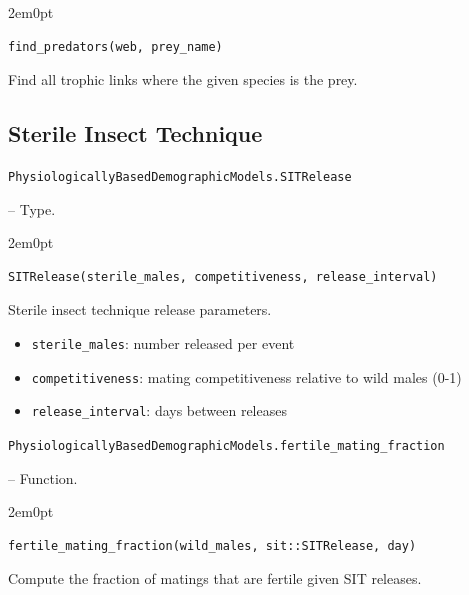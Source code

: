 \begin{adjustwidth}{2em}{0pt}


\begin{verbatim}
find_predators(web, prey_name)
\end{verbatim}

Find all trophic links where the given species is the prey.



\end{adjustwidth}

\subsection{Sterile Insect Technique}



\label{5420200377981931849}{}

\hypertarget{4316825406498246871}{\texttt{PhysiologicallyBasedDemographicModels.SITRelease}}  -- {Type.}

\begin{adjustwidth}{2em}{0pt}


\begin{verbatim}
SITRelease(sterile_males, competitiveness, release_interval)
\end{verbatim}

Sterile insect technique release parameters.

\begin{itemize}
\item \texttt{sterile\_males}: number released per event


\item \texttt{competitiveness}: mating competitiveness relative to wild males (0-1)


\item \texttt{release\_interval}: days between releases

\end{itemize}


\end{adjustwidth}
\hypertarget{6212303415803089858}{\texttt{PhysiologicallyBasedDemographicModels.fertile\_mating\_fraction}}  -- {Function.}

\begin{adjustwidth}{2em}{0pt}


\begin{verbatim}
fertile_mating_fraction(wild_males, sit::SITRelease, day)
\end{verbatim}

Compute the fraction of matings that are fertile given SIT releases.



\end{adjustwidth}

